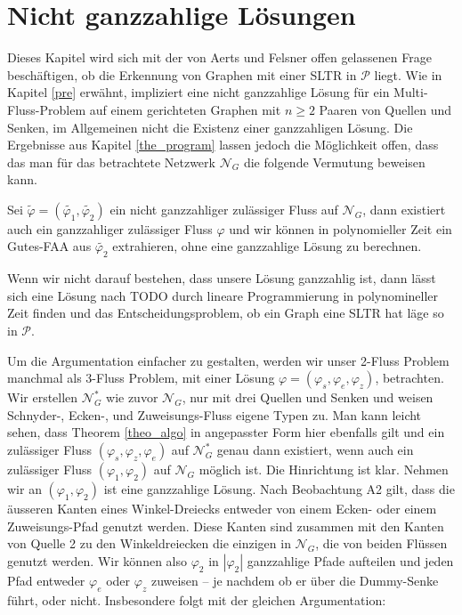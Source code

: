 \section{Nicht ganzzahlige Lösungen}

Dieses Kapitel wird sich mit der von Aerts und Felsner offen gelassenen Frage beschäftigen, ob die Erkennung von Graphen mit einer SLTR in $\mathcal{P}$ liegt. Wie in Kapitel \ref{pre} erwähnt, impliziert eine nicht ganzzahlige Lösung für ein Multi-Fluss-Problem auf einem gerichteten Graphen mit $n\geq 2$ Paaren von Quellen und Senken, im Allgemeinen nicht die Existenz einer ganzzahligen Lösung. Die Ergebnisse aus Kapitel \ref{the_program} lassen jedoch die Möglichkeit offen, dass das man für das betrachtete Netzwerk $\mathcal{N}_G$ die folgende Vermutung beweisen kann.

\begin{conjecture}\label{int_conj}
Sei $\tilde{\varphi}=(\tilde{\varphi_1},\tilde{\varphi_2})$ ein nicht ganzzahliger zulässiger Fluss auf $\mathcal{N}_G$, dann existiert auch ein ganzzahliger zulässiger Fluss $\varphi$ und wir können in polynomieller Zeit ein Gutes-FAA aus $\tilde{\varphi_2}$ extrahieren, ohne eine ganzzahlige Lösung zu berechnen.
\end{conjecture}

\begin{remark}
Wenn wir nicht darauf bestehen, dass unsere Lösung ganzzahlig ist, dann lässt sich eine Lösung nach TODO durch lineare Programmierung in polynomineller Zeit finden und das Entscheidungsproblem, ob ein Graph eine SLTR hat läge so in $\mathcal{P}$.
\end{remark}

Um die Argumentation einfacher zu gestalten, werden wir unser 2-Fluss Problem manchmal als 3-Fluss Problem, mit einer Lösung $\varphi=(\varphi_s,\varphi_e,\varphi_z)$, betrachten. Wir erstellen $\mathcal{N}^*_G$ wie zuvor $\mathcal{N}_G$, nur mit drei Quellen und Senken und weisen {Schnyder-,} Ecken-, und Zuweisungs-Fluss eigene Typen zu. Man kann leicht sehen, dass Theorem \ref{theo_algo} in angepasster Form hier ebenfalls gilt und ein zulässiger  Fluss $(\varphi_s,\varphi_z,\varphi_e)$ auf $\mathcal{N}_G^*$ genau dann existiert, wenn auch ein zulässiger Fluss $(\varphi_1,\varphi_2)$ auf $\mathcal{N}_G$ möglich ist. Die Hinrichtung ist klar. Nehmen wir an $(\varphi_1,\varphi_2)$ ist eine ganzzahlige Lösung. Nach Beobachtung A2 gilt, dass die äusseren Kanten eines Winkel-Dreiecks entweder von einem Ecken- oder einem Zuweisungs-Pfad genutzt werden. Diese Kanten sind zusammen mit den Kanten von Quelle 2 zu den Winkeldreiecken die einzigen in $\mathcal{N}_G$, die von beiden Flüssen genutzt werden. Wir können also $\varphi_2$ in $|\varphi_2|$ ganzzahlige Pfade aufteilen und jeden Pfad entweder $\varphi_e$ oder $\varphi_z$ zuweisen -- je nachdem ob er über die Dummy-Senke führt, oder nicht. Insbesondere folgt mit der gleichen Argumentation:

